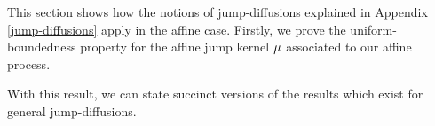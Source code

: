 This section shows how the notions of jump-diffusions explained in Appendix \ref{jump-diffusions} apply in the affine case.
Firstly, we prove the uniform-boundedness property for the affine jump kernel $\mu$ associated to our affine process.



With this result, we can state succinct versions of the results which exist for general jump-diffusions.




